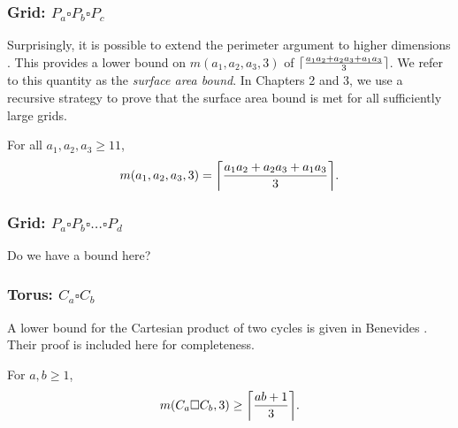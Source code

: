 \subsubsection{Grid: $P_a \square P_b \square P_c$}

Surprisingly, it is possible to extend the perimeter argument to higher dimensions \cite{przykucki:2019}. This provides a lower bound on $m(a_1,a_2,a_3,3)$ of $\lceil\frac{a_1a_2+a_2a_3+a_1a_3}{3}\rceil$. We refer to this quantity as the \emph{surface area bound}. In Chapters 2 and 3, we use a recursive strategy to prove that the surface area bound is met for all sufficiently large grids. 

\begin{thm}
\label{thm:main_result}
For all $a_1, a_2, a_3 \geq 11$, 
$$m(a_1,a_2,a_3,3) = \ceil*{\frac{a_1a_2+a_2a_3+a_1a_3}{3}}.$$
\end{thm}

\subsubsection{Grid: $P_a \square P_b \square \dots \square P_d$}

Do we have a bound here?

\subsubsection{Torus: $C_a \square C_b$}

A lower bound for the Cartesian product of two cycles is given in Benevides \cite{benevides:2021}. Their proof is included here for completeness.

\begin{thm}
\label{thm:torus_lb}
For $a, b \geq 1$,
$$m(C_a \square C_b,3) \geq \ceil*{\frac{ab +1}{3}}.$$
\end{thm}

